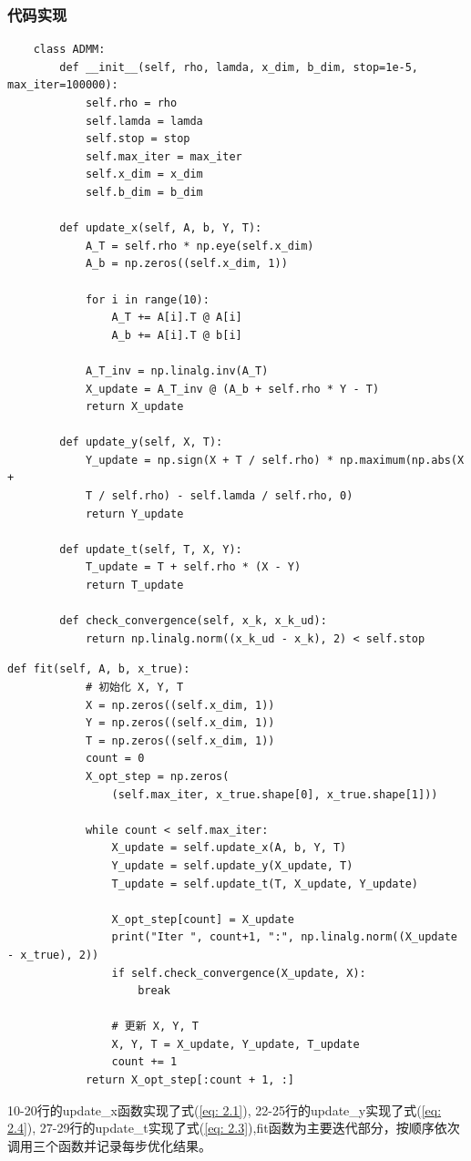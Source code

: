 \documentclass{article}
\begin{document}
\subsubsection{代码实现}
\begin{lstlisting}
    class ADMM:
        def __init__(self, rho, lamda, x_dim, b_dim, stop=1e-5, max_iter=100000):
            self.rho = rho
            self.lamda = lamda
            self.stop = stop
            self.max_iter = max_iter
            self.x_dim = x_dim
            self.b_dim = b_dim

        def update_x(self, A, b, Y, T):
            A_T = self.rho * np.eye(self.x_dim)
            A_b = np.zeros((self.x_dim, 1))

            for i in range(10):
                A_T += A[i].T @ A[i]
                A_b += A[i].T @ b[i]

            A_T_inv = np.linalg.inv(A_T)
            X_update = A_T_inv @ (A_b + self.rho * Y - T)
            return X_update

        def update_y(self, X, T):
            Y_update = np.sign(X + T / self.rho) * np.maximum(np.abs(X +
            T / self.rho) - self.lamda / self.rho, 0)
            return Y_update

        def update_t(self, T, X, Y):
            T_update = T + self.rho * (X - Y)
            return T_update

        def check_convergence(self, x_k, x_k_ud):
            return np.linalg.norm((x_k_ud - x_k), 2) < self.stop
\end{lstlisting}
\newpage
\begin{lstlisting}[firstnumber=33]
        def fit(self, A, b, x_true):
            # 初始化 X, Y, T
            X = np.zeros((self.x_dim, 1))
            Y = np.zeros((self.x_dim, 1))
            T = np.zeros((self.x_dim, 1))
            count = 0
            X_opt_step = np.zeros(
                (self.max_iter, x_true.shape[0], x_true.shape[1]))

            while count < self.max_iter:
                X_update = self.update_x(A, b, Y, T)
                Y_update = self.update_y(X_update, T)
                T_update = self.update_t(T, X_update, Y_update)

                X_opt_step[count] = X_update
                print("Iter ", count+1, ":", np.linalg.norm((X_update - x_true), 2))
                if self.check_convergence(X_update, X):
                    break

                # 更新 X, Y, T
                X, Y, T = X_update, Y_update, T_update
                count += 1
            return X_opt_step[:count + 1, :]
\end{lstlisting}
10-20行的update\_x函数实现了式(\ref{eq: 2.1}), 22-25行的update\_y实现了式(\ref{eq: 2.4}),
27-29行的update\_t实现了式(\ref{eq: 2.3}),fit函数为主要迭代部分，按顺序依次调用三个函数并记录每步优化结果。
\end{document}
